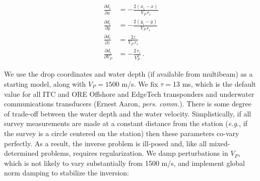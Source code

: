 \begin{align}
\frac{\partial d_i}{\partial x} &= 
	-\frac{2 (x_i - x)}{V_P \, r_i}\\
\frac{\partial d_i}{\partial y} &= 
	-\frac{2 (y_i - y)}{V_P \, r_i} \\
\frac{\partial d_i}{\partial z} &= 
	\frac{2 z}{V_P \, r_i} \\	
\frac{\partial d_i}{\partial V_P} &= 
	-\frac{2 \, r_i}{V_P^2} \,.
\end{align}

We use the drop coordinates and water depth (if available from multibeam) as a starting model, along with $V_P = 1500$ m/s. We fix $\tau =$13 ms, which is the default value for all ITC and ORE Offshore and EdgeTech transponders and underwater communications transducers (Ernest Aaron, \textit{pers. comm.}). There is some degree of trade-off between the water depth and the water velocity. Simplistically, if all survey measurements are made at a constant distance from the station (\textit{e.g.}, if the survey is a circle centered on the station) then these parameters co-vary perfectly. As a result, the inverse problem is ill-posed and, like all mixed-determined problems, requires regularization. We damp perturbations in $V_P$, which is not likely to vary substantially from 1500 m/s, and implement global norm damping to stabilize the inversion:

